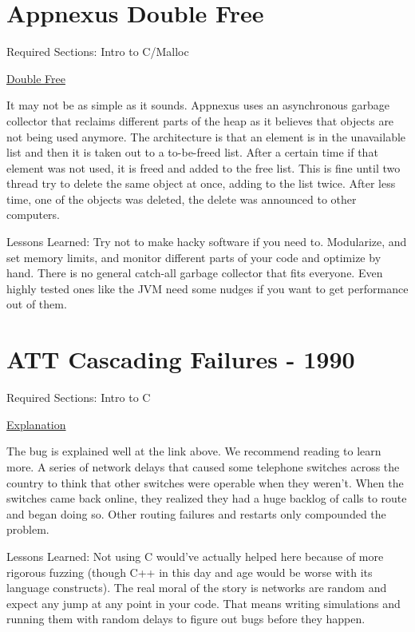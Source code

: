 \section{Appnexus Double Free}

Required Sections: Intro to C/Malloc

\href{https://techblog.appnexus.com/2013-09-17-outage-postmortem-586b19ae4307}{Double Free}

It may not be as simple as it sounds.
Appnexus uses an asynchronous garbage collector that reclaims different parts of the heap as it believes that objects are not being used anymore.
The architecture is that an element is in the unavailable list and then it is taken out to a to-be-freed list.
After a certain time if that element was not used, it is freed and added to the free list.
This is fine until two thread try to delete the same object at once, adding to the list twice. After less time, one of the objects was deleted, the delete was announced to other computers.

Lessons Learned: Try not to make hacky software if you need to. Modularize, and set memory limits, and monitor different parts of your code and optimize by hand. There is no general catch-all garbage collector that fits everyone. Even highly tested ones like the JVM need some nudges if you want to get performance out of them.

\section{ATT Cascading Failures - 1990}

Required Sections: Intro to C

\href{http://users.csc.calpoly.edu/~jdalbey/SWE/Papers/att_collapse.html}{Explanation}

The bug is explained well at the link above.
We recommend reading to learn more.
A series of network delays that caused some telephone switches across the country to think that other switches were operable when they weren't.
When the switches came back online, they realized they had a huge backlog of calls to route and began doing so.
Other routing failures and restarts only compounded the problem.

Lessons Learned: Not using C would've actually helped here because of more rigorous fuzzing (though C++ in this day and age would be worse with its language constructs).
The real moral of the story is networks are random and expect any jump at any point in your code.
That means writing simulations and running them with random delays to figure out bugs before they happen.
